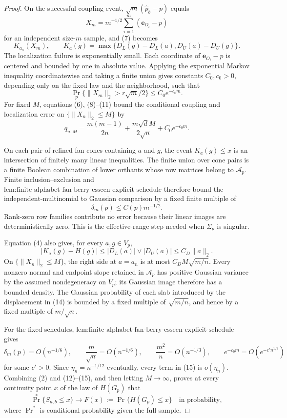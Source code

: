 \documentclass{article}
\begin{document}
\begin{proof}
On the successful coupling event, \(\sqrt m(\widehat p_b-p)\) equals
\[
X_m=m^{-1/2}\sum_{i=1}^m(\mathbf e_{O_i}-p)
\]
for an independent size-\(m\) sample, and (7) becomes
\[
K_{a_n}(X_m),
\qquad
K_a(g)=\max\{D_L(g)-D_L(a),D_U(a)-D_U(g)\}.
\tag{10}
\]
The localization failure is exponentially small. Each coordinate of \(\mathbf e_{O_i}-p\) is centered and bounded by one in absolute value. Applying the exponential Markov inequality coordinatewise and taking a finite union gives constants \(C_0,c_0>0\), depending only on the fixed law and the neighborhood, such that
\[
\Pr_p\{\|X_m\|_2>r\sqrt m/2\}\leq C_0e^{-c_0m}.
\tag{11}
\]
For fixed \(M\), equations (6), (8)--(11) bound the conditional coupling and localization error on \(\{\|X_n\|_2\leq M\}\) by
\[
q_{n,M}=\frac{m(m-1)}{2n}
+\frac{m\sqrt d M}{2\sqrt n}+C_0e^{-c_0m}.
\tag{12}
\]

On each pair of refined fan cones containing \(a\) and \(g\), the event \(K_a(g)\leq x\) is an intersection of finitely many linear inequalities. The finite union over cone pairs is a finite Boolean combination of lower orthants whose row matrices belong to \(\mathcal A_p\). Finite inclusion--exclusion and \(\text{lem:finite-alphabet-fan-berry-esseen-explicit-schedule}\) therefore bound the independent-multinomial to Gaussian comparison by a fixed finite multiple of
\[
\delta_m(p)\leq C(p)m^{-1/2}.
\tag{13}
\]
Rank-zero row families contribute no error because their linear images are deterministically zero. This is the effective-range step needed when \(\Sigma_p\) is singular.

Equation (4) also gives, for every \(a,g\in V_p\),
\[
|K_a(g)-H(g)|
\leq |D_L(a)|\vee|D_U(a)|
\leq C_D\|a\|_2.
\tag{14}
\]
On \(\{\|X_n\|_2\leq M\}\), the right side at \(a=a_n\) is at most \(C_DM\sqrt{m/n}\). Every nonzero normal and endpoint slope retained in \(\mathcal A_p\) has positive Gaussian variance by the assumed nondegeneracy on \(V_p\); its Gaussian image therefore has a bounded density. The Gaussian probability of each slab introduced by the displacement in (14) is bounded by a fixed multiple of \(\sqrt{m/n}\), and hence by a fixed multiple of \(m/\sqrt n\).

For the fixed schedules, \(\text{lem:finite-alphabet-fan-berry-esseen-explicit-schedule}\) gives
\[
\delta_m(p)=O(n^{-1/6}),
\qquad
\frac m{\sqrt n}=O(n^{-1/6}),
\qquad
\frac{m^2}{n}=O(n^{-1/3}),
\qquad
e^{-c_0m}=O(e^{-c'n^{1/3}})
\tag{15}
\]
for some \(c'>0\). Since \(\eta_n=n^{-1/12}\) eventually, every term in (15) is \(o(\eta_n)\). Combining (2) and (12)--(15), and then letting \(M\to\infty\), proves at every continuity point \(x\) of the law of \(H(G_p)\) that
\[
\Pr^*\{S_{n,b}\leq x\}\longrightarrow
F(x):=\Pr\{H(G_p)\leq x\}
\quad\text{in probability},
\tag{16}
\]
where \(\Pr^*\) is conditional probability given the full sample.


\end{proof}
\end{document}

